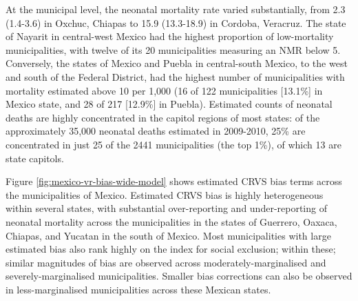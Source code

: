 \documentclass[
]{report}
\begin{document}
At the municipal level, the neonatal mortality rate varied substantially, from 2.3 (1.4-3.6) in Oxchuc, Chiapas to 15.9 (13.3-18.9) in Cordoba, Veracruz. The state of Nayarit in central-west Mexico had the highest proportion of low-mortality municipalities, with twelve of its 20 municipalities measuring an NMR below 5. Conversely, the states of Mexico and Puebla in central-south Mexico, to the west and south of the Federal District, had the highest number of municipalities with mortality estimated above 10 per 1,000 (16 of 122 municipalities {[}13.1\%{]} in Mexico state, and 28 of 217 {[}12.9\%{]} in Puebla). Estimated counts of neonatal deaths are highly concentrated in the capitol regions of most states: of the approximately 35,000 neonatal deaths estimated in 2009-2010, 25\% are concentrated in just 25 of the 2441 municipalities (the top 1\%), of which 13 are state capitols.

Figure \ref{fig:mexico-vr-bias-wide-model} shows estimated CRVS bias terms across the municipalities of Mexico. Estimated CRVS bias is highly heterogeneous within several states, with substantial over-reporting and under-reporting of neonatal mortality across the municipalities in the states of Guerrero, Oaxaca, Chiapas, and Yucatan in the south of Mexico. Most municipalities with large estimated bias also rank highly on the index for social exclusion; within these; similar magnitudes of bias are observed across moderately-marginalised and severely-marginalised municipalities. Smaller bias corrections can also be observed in less-marginalised municipalities across these Mexican states.
\end{document}
